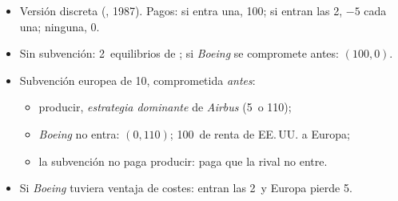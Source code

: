 \documentclass{article}
\begin{document}
\begin{columnas}
\begin{itemize}
\item Versión discreta (, 1987). Pagos: si entra una, 100; si entran las 2, $-5$ cada una; ninguna, 0.
\item Sin subvención: 2~equilibrios de ; si \emph{Boeing} se compromete antes: $(100,0)$.
\item Subvención europea de 10, comprometida \emph{antes}:
  \begin{itemize}
  \item producir, \emph{estrategia dominante} de \emph{Airbus} (5~o 110);
  \item \emph{Boeing} no entra: $(0,110)$; 100~de renta de EE.\,UU. a Europa;
  \item la subvención no paga producir: paga que la rival no entre.
  \end{itemize}
\item Si \emph{Boeing} tuviera ventaja de costes: entran las 2~y Europa pierde 5.
\end{itemize}


\end{columnas}
\end{document}
